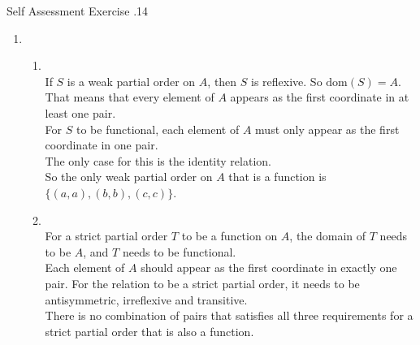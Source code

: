 \documentclass[../notes.tex]{subfiles}
\begin{document}
\begin{exercise}{Self Assessment Exercise \thechapter.14}
\begin{enumerate}
\begin{description}
							\end{description}
						\item {}
							\begin{enumerate}[label=(\alph*)]
								\item {}\\
									If $S$ is a weak partial order on $A$, then $S$ is reflexive. So $\mathrm{dom}(S) = A$.\\
									That means that every element of $A$ appears as the first coordinate in at least one pair.\\
									For $S$ to be functional, each element of $A$ must only appear as the first coordinate in one pair.\\
									The only case for this is the identity relation.\\
									So the only weak partial order on $A$ that is a function is $\bigl\{(a, a), (b, b), (c, c)\bigr\}$.
								\item {}\\
									For a strict partial order $T$ to be a function on $A$, the domain of $T$ needs to be $A$, and $T$ needs to be functional.\\
									Each element of $A$ should appear as the first coordinate in exactly one pair. For the relation to be a strict partial order, it needs to be antisymmetric, irreflexive and transitive.\\
									There is no combination of pairs that satisfies all three requirements for a strict partial order that is also a function.
							\end{enumerate}
					\end{enumerate}
				\end{exercise}
\end{document}
